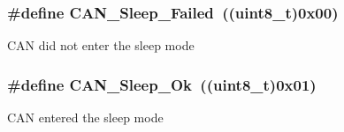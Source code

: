 \subsubsection[{C\+A\+N\+\_\+\+Sleep\+\_\+\+Failed}]{\setlength{\rightskip}{0pt plus 5cm}\#define C\+A\+N\+\_\+\+Sleep\+\_\+\+Failed~((uint8\+\_\+t)0x00)}\label{group___c_a_n__sleep__constants_ga169500ab7169c4e9c7e9e4ea34b3e070}
C\+A\+N did not enter the sleep mode \hypertarget{group___c_a_n__sleep__constants_gaf5c4e9d32d4faff9d0bf61e153ed7998}{}
\subsubsection[{C\+A\+N\+\_\+\+Sleep\+\_\+\+Ok}]{\setlength{\rightskip}{0pt plus 5cm}\#define C\+A\+N\+\_\+\+Sleep\+\_\+\+Ok~((uint8\+\_\+t)0x01)}\label{group___c_a_n__sleep__constants_gaf5c4e9d32d4faff9d0bf61e153ed7998}
C\+A\+N entered the sleep mode 